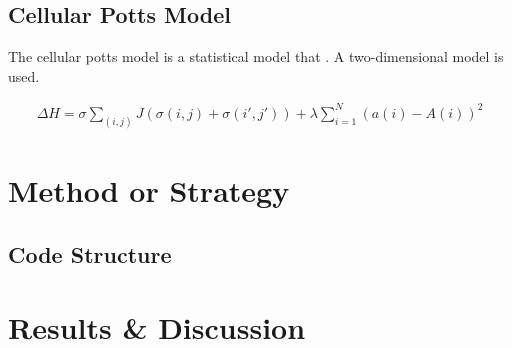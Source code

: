 \documentclass[a4paper,12pt]{article}
\begin{document}
\subsection{Cellular Potts Model}
The cellular potts model is a statistical model that . A two-dimensional model is used.


\begin{eqnarray}
\Delta H = \sigma \sum_{\left(i,j\right)} J\left(\sigma(i,j) + \sigma(i',j')\right) + \lambda \sum_{i=1}^{N} \left(a(i) - A(i)\right)^2
\end{eqnarray}

\pagebreak
\section{Method or Strategy}

\subsection{Code Structure}

%
%

\pagebreak
\section{Results \& Discussion}
\end{document}
